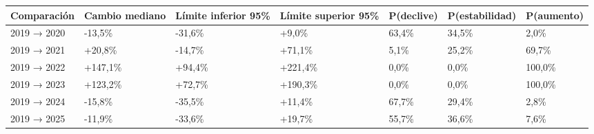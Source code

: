 \begin{tabular}{lllllll}
\toprule
Comparación & Cambio mediano & Límite inferior 95\% & Límite superior 95\% & P(declive) & P(estabilidad) & P(aumento) \\
\midrule
2019 → 2020 & -13,5\% & -31,6\% & +9,0\% & 63,4\% & 34,5\% & 2,0\% \\
2019 → 2021 & +20,8\% & -14,7\% & +71,1\% & 5,1\% & 25,2\% & 69,7\% \\
2019 → 2022 & +147,1\% & +94,4\% & +221,4\% & 0,0\% & 0,0\% & 100,0\% \\
2019 → 2023 & +123,2\% & +72,7\% & +190,3\% & 0,0\% & 0,0\% & 100,0\% \\
2019 → 2024 & -15,8\% & -35,5\% & +11,4\% & 67,7\% & 29,4\% & 2,8\% \\
2019 → 2025 & -11,9\% & -33,6\% & +19,7\% & 55,7\% & 36,6\% & 7,6\% \\
\bottomrule
\end{tabular}
